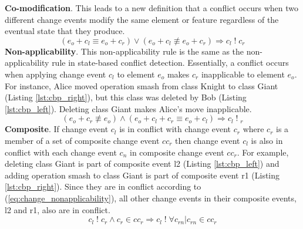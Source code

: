 \textbf{Co-modification}. This leads to a new definition that a conflict occurs when two different change events modify the same element or feature regardless of the eventual state that they produce.
\begin{equation} \label{eq:change_comodifiability}
(e_{o} + c_{l} \equiv e_{o} + c_{r}) \vee (e_{o} + c_{l} \not\equiv e_{o} + c_{r}) \Rightarrow c_{l}\;!\;c_{r}
\end{equation}
\textbf{Non-applicability}. This non-applicability rule is the same as the non-applicability rule in state-based conflict detection. Essentially, a conflict occurs when applying change event $c_{l}$ to element $e_{o}$ makes $c_{r}$ inapplicable to element $e_{o}$. For instance, Alice moved operation \textsf{smash} from class \textsf{Knight} to class \textsf{Giant} (Listing \ref{lst:cbp_right}), but this class was deleted by Bob (Listing \ref{lst:cbp_left}). Deleting class \textsf{Giant} makes Alice’s move inapplicable.
\begin{equation} \label{eq:change_nonapplicability}
(e_{o} + c_{r} \not\equiv e_{o}) \wedge (e_{o} + c_{l} + c_{r} \equiv e_{o} + c_{l}) \Rightarrow c_{l}\;!\;_{r}
\end{equation}
\textbf{Composite}. If change event $c_{l}$ is in conflict with change event $c_{r}$ where $c_{r}$ is a member of a set of composite change event $cc_{r}$ then change event $c_{l}$ is also in conflict with each change event $c_{n}$ in composite change event $cc_{r}$. For example, deleting class \textsf{Giant} is part of composite event \textsf{l2} (Listing \ref{lst:cbp_left}) and adding operation \textsf{smash} to class \textsf{Giant} is part of composite event \textsf{r1} (Listing \ref{lst:cbp_right}). Since they are in conflict according to (\ref{eq:change_nonapplicability}), all other change events in their composite events, \textsf{l2} and \textsf{r1}, also are in conflict.
\begin{equation} \label{eq:change_composite}
c_{l}\;!\;c_{r} \wedge c_{r} \in cc_{r} \Rightarrow c_{l}\;!\; \forall c_{rn} | c_{rn} \in cc_{r}
\end{equation}

